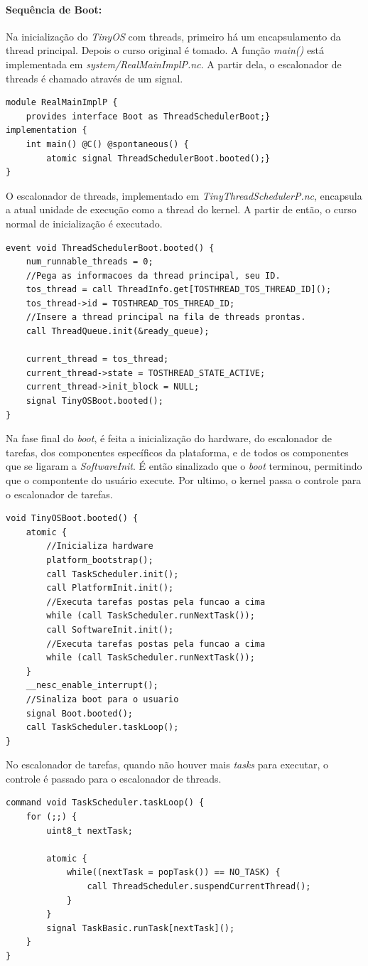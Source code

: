 \documentclass[a4paper, 10pt]{article}
\begin{document}
\paragraph{Sequência de Boot:}
Na inicialização do \textit{TinyOS} com threads, primeiro há um encapsulamento da thread principal. Depois o curso
original é tomado.
A função \textit{main()} está implementada em \textit{system/RealMainImplP.nc}. A partir dela, o escalonador de threads
é chamado através de um signal.
\begin{lstlisting}
module RealMainImplP {
    provides interface Boot as ThreadSchedulerBoot;}
implementation {
    int main() @C() @spontaneous() {
        atomic signal ThreadSchedulerBoot.booted();}
}
\end{lstlisting}
O escalonador de threads, implementado em \textit{TinyThreadSchedulerP.nc}, encapsula a atual unidade de execução
como a thread do kernel. A partir de então, o curso normal de inicialização é executado. 
\begin{lstlisting}
event void ThreadSchedulerBoot.booted() {
    num_runnable_threads = 0;
    //Pega as informacoes da thread principal, seu ID.
    tos_thread = call ThreadInfo.get[TOSTHREAD_TOS_THREAD_ID]();
    tos_thread->id = TOSTHREAD_TOS_THREAD_ID;
    //Insere a thread principal na fila de threads prontas.
    call ThreadQueue.init(&ready_queue);

    current_thread = tos_thread;
    current_thread->state = TOSTHREAD_STATE_ACTIVE;
    current_thread->init_block = NULL;
    signal TinyOSBoot.booted();
}
\end{lstlisting}
Na fase final do \textit{boot}, é feita a inicialização do hardware, do escalonador de tarefas, dos componentes
específicos da plataforma, e de todos os componentes que se ligaram a \textit{SoftwareInit}. É então sinalizado que o 
\textit{boot} terminou, permitindo que o compontente do usuário execute. Por ultimo, o kernel passa o controle para o
escalonador de tarefas.
\begin{lstlisting}
void TinyOSBoot.booted() {
    atomic {
        //Inicializa hardware
        platform_bootstrap();
        call TaskScheduler.init();
        call PlatformInit.init();
        //Executa tarefas postas pela funcao a cima
        while (call TaskScheduler.runNextTask());
        call SoftwareInit.init();
        //Executa tarefas postas pela funcao a cima
        while (call TaskScheduler.runNextTask());
    }
    __nesc_enable_interrupt();
    //Sinaliza boot para o usuario
    signal Boot.booted();
    call TaskScheduler.taskLoop();
}
\end{lstlisting}
No escalonador de tarefas, quando não houver mais \textit{tasks} para executar, o controle é passado para o escalonador
de threads.
\begin{lstlisting}
command void TaskScheduler.taskLoop() {
    for (;;) {
        uint8_t nextTask;

        atomic {
            while((nextTask = popTask()) == NO_TASK) {
                call ThreadScheduler.suspendCurrentThread();
            }
        }
        signal TaskBasic.runTask[nextTask]();
    }
}
\end{lstlisting}
\end{document}
